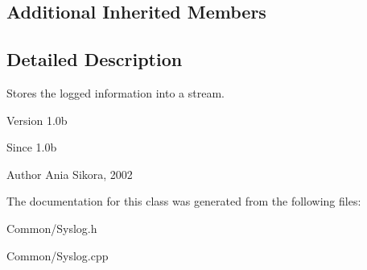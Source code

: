 \subsection*{Additional Inherited Members}


\subsection{Detailed Description}
Stores the logged information into a stream. 

\begin{DoxyVersion}{Version}
1.\-0b 
\end{DoxyVersion}
\begin{DoxySince}{Since}
1.\-0b 
\end{DoxySince}
\begin{DoxyAuthor}{Author}
Ania Sikora, 2002 
\end{DoxyAuthor}


The documentation for this class was generated from the following files\-:\begin{DoxyCompactItemize}
\item 
Common/Syslog.\-h\item 
Common/Syslog.\-cpp\end{DoxyCompactItemize}
